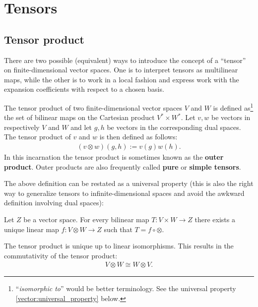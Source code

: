 \section{Tensors}\label{section:tensors}
\subsection{Tensor product}

    There are two possible (equivalent) ways to introduce the concept of a ``tensor'' on finite-dimensional vector spaces. One is to interpret tensors as multilinear maps, while the other is to work in a local fashion and express work with the expansion coefficients with respect to a chosen basis.

    \begin{definition}\label{vector:tensor_product}
        The tensor product of two finite-dimensional vector spaces $V$ and $W$ is defined as\footnote{``\textit{isomorphic to}'' would be better terminology. See the universal property \ref{vector:universal_property} below.} the set of bilinear maps on the Cartesian product $V^*\times W^*$. Let $v,w$ be vectors in respectively $V$ and $W$ and let $g,h$ be vectors in the corresponding dual spaces. The tensor product of $v$ and $w$ is then defined as follows:
        \begin{gather}
            (v\otimes w)(g,h) := v(g)w(h).
        \end{gather}
        In this incarnation the tensor product is sometimes known as the \textbf{outer product}. Outer products are also frequently called \textbf{pure} or \textbf{simple tensors}.
    \end{definition}

    The above definition can be restated as a universal property (this is also the right way to generalize tensors to infinite-dimensional spaces and avoid the awkward definition involving dual spaces):
    \begin{uproperty}\label{vector:universal_property}
        Let $Z$ be a vector space. For every bilinear map $T:V\times W\rightarrow Z$ there exists a unique linear map $f:V\otimes W\rightarrow Z$ such that $T = f\circ\otimes$.
    \end{uproperty}
    \begin{result}
        The tensor product is unique up to linear isomorphisms. This results in the commutativity of the tensor product:
        \begin{gather}
           \label{vector:commutativity}
            V\otimes W \cong W\otimes V.
        \end{gather}
    \end{result}

